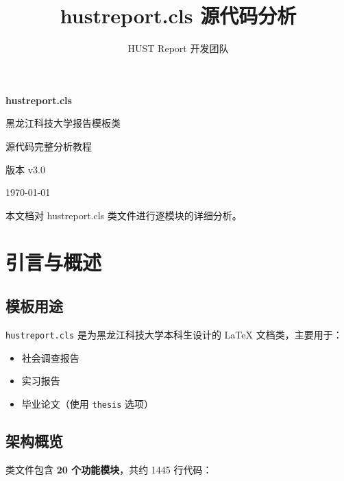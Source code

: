\documentclass[linux]{hustreport}
\title{hustreport.cls 源代码分析}
\author{HUST Report 开发团队}
\begin{document}
\begin{titlepage}
    \centering
    \vspace*{3cm}
    {\Huge\bfseries\heiti hustreport.cls\par}
    \vspace{0.5cm}
    {\Large\songti 黑龙江科技大学报告模板类\par}
    \vspace{1cm}
    {\large 源代码完整分析教程\par}
    \vspace{2cm}
    {\large 版本 v3.0\par}
    \vspace{0.5cm}
    {\large \today\par}
    \vfill
    {\small 本文档对 hustreport.cls 类文件进行逐模块的详细分析。\par}
\end{titlepage}

\tableofcontents
\newpage

\section{引言与概述}

\subsection{模板用途}

\texttt{hustreport.cls} 是为黑龙江科技大学本科生设计的 \LaTeX{} 文档类，主要用于：

\begin{itemize}
    \item 社会调查报告
    \item 实习报告
    \item 毕业论文（使用 \texttt{thesis} 选项）
\end{itemize}

\subsection{架构概览}

类文件包含 \textbf{20 个功能模块}，共约 1445 行代码：
\end{document}
